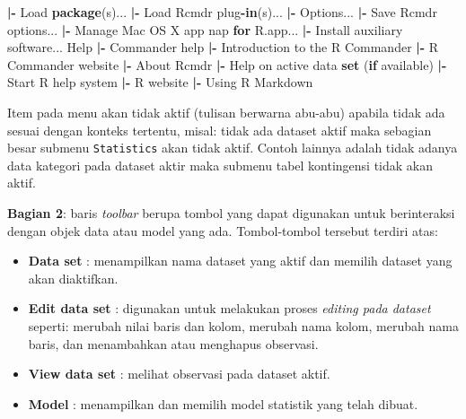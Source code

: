 \documentclass[12pt,]{krantz}
\newenvironment{Shaded}{\begin{snugshade}}{\end{snugshade}}
\newcommand{\ControlFlowTok}[1]{\textcolor[rgb]{0.13,0.29,0.53}{\textbf{#1}}}
\newcommand{\KeywordTok}[1]{\textcolor[rgb]{0.13,0.29,0.53}{\textbf{#1}}}
\newcommand{\NormalTok}[1]{#1}
\newcommand{\OperatorTok}[1]{\textcolor[rgb]{0.81,0.36,0.00}{\textbf{#1}}}
\newcommand{\StringTok}[1]{\textcolor[rgb]{0.31,0.60,0.02}{#1}}
\providecommand{\tightlist}{%
  \setlength{\itemsep}{0pt}\setlength{\parskip}{0pt}}
\begin{document}
\begin{Shaded}
\begin{Highlighting}[]
  \OperatorTok{|-}\StringTok{ }\NormalTok{Load }\KeywordTok{package}\NormalTok{(s)...}
  \OperatorTok{|-}\StringTok{ }\NormalTok{Load Rcmdr plug}\OperatorTok{-}\ControlFlowTok{in}\NormalTok{(s)...}
  \OperatorTok{|-}\StringTok{ }\NormalTok{Options...}
  \OperatorTok{|-}\StringTok{ }\NormalTok{Save Rcmdr options...}
  \OperatorTok{|-}\StringTok{ }\NormalTok{Manage Mac OS X app nap }\ControlFlowTok{for}\NormalTok{ R.app...}
  \OperatorTok{|-}\StringTok{ }\NormalTok{Install auxiliary software...}
\NormalTok{Help}
  \OperatorTok{|-}\StringTok{ }\NormalTok{Commander help}
  \OperatorTok{|-}\StringTok{ }\NormalTok{Introduction to the R Commander}
  \OperatorTok{|-}\StringTok{ }\NormalTok{R Commander website}
  \OperatorTok{|-}\StringTok{ }\NormalTok{About Rcmdr}
  \OperatorTok{|-}\StringTok{ }\NormalTok{Help on active data }\KeywordTok{set}\NormalTok{ (}\ControlFlowTok{if}\NormalTok{ available)}
  \OperatorTok{|-}\StringTok{ }\NormalTok{Start R help system}
  \OperatorTok{|-}\StringTok{ }\NormalTok{R website}
  \OperatorTok{|-}\StringTok{ }\NormalTok{Using R Markdown}
\end{Highlighting}
\end{Shaded}

Item pada menu akan tidak aktif (tulisan berwarna abu-abu) apabila tidak ada sesuai dengan konteks tertentu, misal: tidak ada dataset aktif maka sebagian besar submenu \texttt{Statistics} akan tidak aktif. Contoh lainnya adalah tidak adanya data kategori pada dataset aktir maka submenu tabel kontingensi tidak akan aktif.

\textbf{Bagian 2}: baris \emph{toolbar} berupa tombol yang dapat digunakan untuk berinteraksi dengan objek data atau model yang ada. Tombol-tombol tersebut terdiri atas:

\begin{itemize}
\tightlist
\item
  \textbf{Data set} : menampilkan nama dataset yang aktif dan memilih dataset yang akan diaktifkan.
\item
  \textbf{Edit data set} : digunakan untuk melakukan proses \emph{editing pada dataset} seperti: merubah nilai baris dan kolom, merubah nama kolom, merubah nama baris, dan menambahkan atau menghapus observasi.
\item
  \textbf{View data set} : melihat observasi pada dataset aktif.
\item
  \textbf{Model} : menampilkan dan memilih model statistik yang telah dibuat.
\end{itemize}
\end{document}

